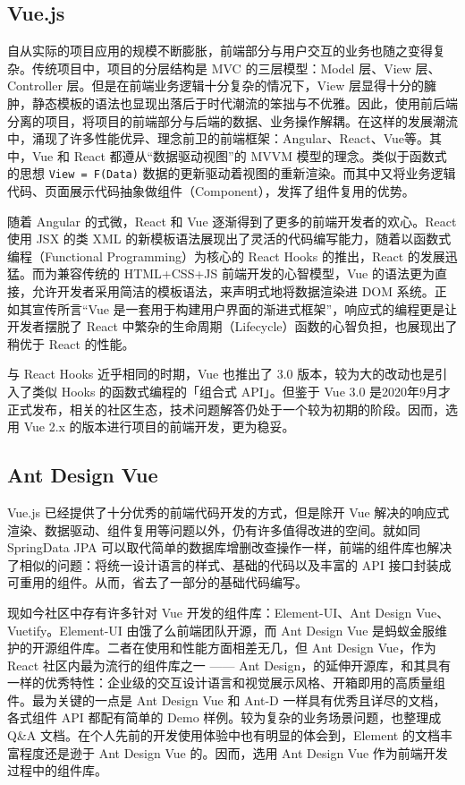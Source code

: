 \subsection{Vue.js}
自从实际的项目应用的规模不断膨胀，前端部分与用户交互的业务也随之变得复杂。传统项目中，项目的分层结构是 MVC 的三层模型：Model 层、View 层、Controller 层。但是在前端业务逻辑十分复杂的情况下，View 层显得十分的臃肿，静态模板的语法也显现出落后于时代潮流的笨拙与不优雅。因此，使用前后端分离的项目，将项目的前端部分与后端的数据、业务操作解耦。在这样的发展潮流中，涌现了许多性能优异、理念前卫的前端框架：Angular、React、Vue等。其中，Vue 和 React 都遵从“数据驱动视图”的 MVVM 模型的理念。类似于函数式的思想 \verb!View = F(Data)! 数据的更新驱动着视图的重新渲染。而其中又将业务逻辑代码、页面展示代码抽象做组件（Component），发挥了组件复用的优势。

随着 Angular 的式微，React 和 Vue 逐渐得到了更多的前端开发者的欢心。React 使用 JSX 的类 XML 的新模板语法展现出了灵活的代码编写能力，随着以函数式编程（Functional Programming）为核心的 React Hooks 的推出，React 的发展迅猛。而为兼容传统的 HTML+CSS+JS 前端开发的心智模型，Vue 的语法更为直接，允许开发者采用简洁的模板语法，来声明式地将数据渲染进 DOM 系统。正如其宣传所言“Vue 是一套用于构建用户界面的渐进式框架”，响应式的编程更是让开发者摆脱了 React 中繁杂的生命周期（Lifecycle）函数的心智负担，也展现出了稍优于 React 的性能。

与 React Hooks 近乎相同的时期，Vue 也推出了 3.0 版本，较为大的改动也是引入了类似 Hooks 的函数式编程的「组合式 API」。但鉴于 Vue 3.0 是2020年9月才正式发布，相关的社区生态，技术问题解答仍处于一个较为初期的阶段。因而，选用 Vue 2.x 的版本进行项目的前端开发，更为稳妥。

\subsection{Ant Design Vue}
Vue.js 已经提供了十分优秀的前端代码开发的方式，但是除开 Vue 解决的响应式渲染、数据驱动、组件复用等问题以外，仍有许多值得改进的空间。就如同 SpringData JPA 可以取代简单的数据库增删改查操作一样，前端的组件库也解决了相似的问题：将统一设计语言的样式、基础的代码以及丰富的 API 接口封装成可重用的组件。从而，省去了一部分的基础代码编写。

现如今社区中存有许多针对 Vue 开发的组件库：Element-UI、Ant Design Vue、Vuetify。Element-UI 由饿了么前端团队开源，而 Ant Design Vue 是蚂蚁金服维护的开源组件库。二者在使用和性能方面相差无几，但 Ant Design Vue，作为React 社区内最为流行的组件库之一 —— Ant Design，的延伸开源库，和其具有一样的优秀特性：企业级的交互设计语言和视觉展示风格、开箱即用的高质量组件。最为关键的一点是 Ant Design Vue 和 Ant-D 一样具有优秀且详尽的文档，各式组件 API 都配有简单的 Demo 样例。较为复杂的业务场景问题，也整理成 Q\&A 文档。在个人先前的开发使用体验中也有明显的体会到，Element 的文档丰富程度还是逊于 Ant Design Vue 的。因而，选用 Ant Design Vue 作为前端开发过程中的组件库。

